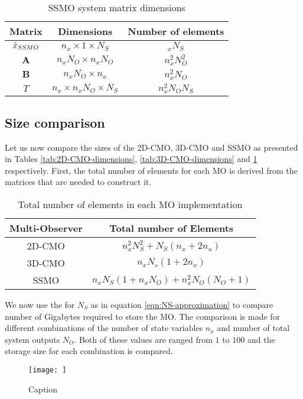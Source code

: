 \begin{table}[h]
    \centering
    \begin{tabular}{c|c|c}
       Matrix  & Dimensions & Number of elements \\ \hline
       $\Tilde{x}_{SSMO}$  & $ n_x \times 1 \times N_S$ & $_xN_S$ \\
       $\mathbf{A}$ & $n_xN_O \times n_xN_O$ & $n_x^2N_O^2$ \\ 
       $\mathbf{B}$ & $n_xN_O \times n_x$ & $n_x^2N_O$ \\
       $T$ & $n_x \times n_xN_O \times N_S$ & $n_x^2N_ON_S$ \\
    \end{tabular}
    \caption{SSMO system matrix dimensions}
    \label{tab:SSMO-dimensions}
\end{table}

\subsection{Size comparison}
Let us now compare the sizes of the 2D-CMO, 3D-CMO and SSMO as presented in Tables \ref{tab:2D-CMO-dimensions}, \ref{tab:3D-CMO-dimensions} and \ref{tab:SSMO-dimensions} respectively. First, the total number of elements for each MO is derived from the matrices that are needed to construct it. 
\begin{table}[h]
    \centering
    \begin{tabular}{c|c}
        Multi-Observer & Total number of Elements \\
        \hline
        2D-CMO & $n_x^2N_S^2 + N_S(n_x+2n_u)$ \\
        3D-CMO & $n_xN_s(1+2n_x)$ \\
        SSMO   & $n_xN_S(1+n_xN_O) + n_x^2N_O(N_O+1)$ \\
    \end{tabular}
    \caption{Total number of elements in each MO implementation}
    \label{tab:my_label}
\end{table}

We now use the for $N_S$ as in equation \eqref{eqn:NS-approximation} to compare number of Gigabytes required to store the MO. The comparison is made for different combinations of the number of state variables $n_x$ and number of total system outputs $N_O$. Both of these values are ranged from $1$ to $100$ and the storage size for each combination is compared.

\begin{figure}
    \centering
    \texttt{[image: ]}
    \caption{Caption}
    \label{fig:enter-label}
\end{figure}
